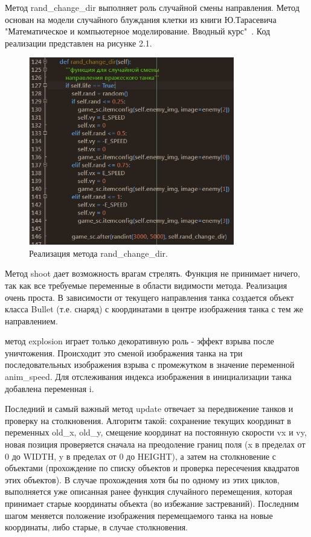 \begin{itemize}
\begin{itemize}
    Метод rand\_change\_dir выполняет роль случайной смены направления. Метод основан на модели случайного блуждания клетки из книги Ю.Тарасевича "Математическое и компьютерное моделирование. Вводный курс"~\cite{book-math-mod}. Код реализации представлен на рисунке 2.1.

    \begin{figure}[h!]
        \centering
        \includegraphics[width=0.8\textwidth]{./images/image3.png}
        \caption{\centering\label{fig:example05}Реализация метода rand\_change\_dir.}
    \end{figure}
    
    Метод shoot дает возможность врагам стрелять. Функция не принимает ничего, так как все требуемые переменные в области видимости метода. Реализация очень проста. В зависимости от текущего направления танка создается объект класса Bullet (т.е. снаряд) с координатами в центре изображения танка с тем же направлением.

    метод explosion играет только декоративную роль - эффект взрыва после уничтожения. Происходит это сменой изображения танка на три последовательных изображения взрыва с промежутком в значение переменной anim\_speed. Для отслеживания индекса изображения в инициализации танка добавлена переменная i.

    Последний и самый важный метод update отвечает за передвижение танков и проверку на столкновения. Алгоритм такой: сохранение текущих координат в переменных old\_x, old\_y, смещение координат на постоянную скорости vx и vy, новая позиция проверяется сначала на преодоление границ поля (x в пределах от 0 до WIDTH, y в пределах от 0 до HEIGHT), а затем на столкновение с объектами (прохождение по списку объектов и проверка пересечения квадратов этих объектов). В случае прохождения хотя бы по одному из этих циклов, выполняется уже описанная ранее функция случайного перемещения, которая принимает старые координаты объекта (во избежание застреваний). Последним шагом меняется положение изображения перемещаемого танка на новые координаты, либо старые, в случае столкновения.
    

\end{itemize}
\end{itemize}
